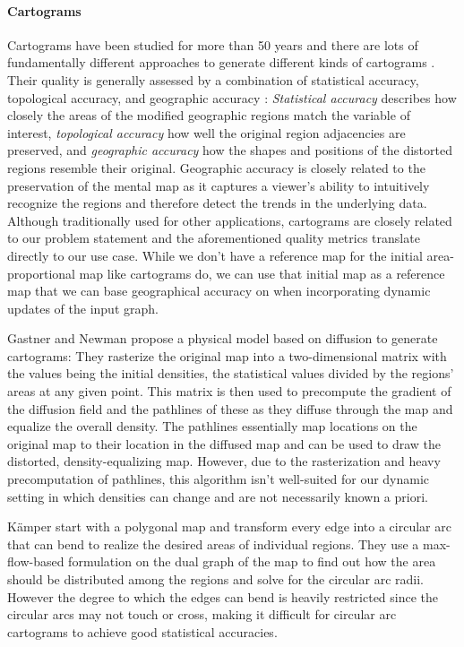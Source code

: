 \paragraph{Cartograms}

Cartograms have been studied for more than 50 years \cite{tobler2004thirty} and there are lots of fundamentally different approaches to generate different kinds of cartograms \cite{nusrat2016state}. Their quality is generally assessed by a combination of statistical accuracy, topological accuracy, and geographic accuracy \cite{alam2015quantitative}: \emph{Statistical accuracy} describes how closely the areas of the modified geographic regions match the variable of interest, \emph{topological accuracy} how well the original region adjacencies are preserved, and \emph{geographic accuracy} how the shapes and positions of the distorted regions resemble their original. Geographic accuracy is closely related to the preservation of the mental map as it captures a viewer's ability to intuitively recognize the regions and therefore detect the trends in the underlying data. Although traditionally used for other applications, cartograms are closely related to our problem statement and the aforementioned quality metrics translate directly to our use case. While we don't have a reference map for the initial area-proportional map like cartograms do, we can use that initial map as a reference map that we can base geographical accuracy on when incorporating dynamic updates of the input graph.

Gastner and Newman \cite{gastner2004diffusion} propose a physical model based on diffusion to generate cartograms: They rasterize the original map into a two-dimensional matrix with the values being the initial densities, \ie{} the statistical values divided by the regions' areas at any given point. This matrix is then used to precompute the gradient of the diffusion field and the pathlines of these  as they diffuse through the map and equalize the overall density. The pathlines essentially map locations on the original map to their location in the diffused map and can be used to draw the distorted, density-equalizing map. However, due to the rasterization and heavy precomputation of pathlines, this algorithm isn't well-suited for our dynamic setting in which densities can change and are not necessarily known a priori.

Kämper \etal{} \cite{kamper2013circular} start with a polygonal map and transform every edge into a circular arc that can bend to realize the desired areas of individual regions. They use a max-flow-based formulation on the dual graph of the map to find out how the area should be distributed among the regions and solve for the circular arc radii. However the degree to which the edges can bend is heavily restricted since the circular arcs may not touch or cross, making it difficult for circular arc cartograms to achieve good statistical accuracies.

